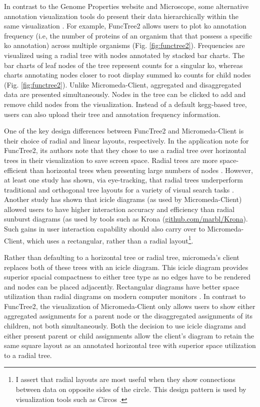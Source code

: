 In contrast to the Genome Properties website and Microscope, some alternative 
annotation visualization tools do present their data hierarchically within the 
same visualization \cite{darzi2019functree2}. For example, FuncTree2 
\cite{darzi2019functree2} allows users to plot \gls{ko} annotation 
\cite{mao2005automated,kanehisa2011kegg} frequency (i.e, the number of proteins 
of an organism that that possess a specific \gls{ko} annotation) across 
multiple organisms (Fig. \ref{fig:functree2}). Frequencies are visualized using 
a radial tree with nodes annotated by stacked bar charts. The bar charts of leaf 
nodes of the tree represent counts for a singular \gls{ko}, whereas charts 
annotating nodes closer to root display summed \gls{ko} counts for child nodes 
(Fig. \ref{fig:functree2}). Unlike Micromeda-Client, aggregated and 
disaggregated data are presented simultaneously. Nodes in the tree can be clicked 
to add and remove child nodes from the visualization. Instead of a default 
\gls{kegg}-based tree, users can also upload their tree and annotation frequency 
information.

One of the key design differences between FuncTree2 and Micromeda-Client is 
their choice of radial and linear layouts, respectively. In the application note 
for FuncTree2, its authors note that they chose to use a radial tree over 
horizontal trees in their visualization to save screen space. Radial trees are 
more space-efficient than horizontal trees when presenting large numbers of 
nodes \cite{burch2011evaluation}. However, at least one study has shown, via 
eye-tracking, that radial trees underperform traditional and orthogonal tree 
layouts for a variety of visual search tasks \cite{burch2011evaluation}. Another 
study has shown that icicle diagrams (as used by Micromeda-Client) allowed users 
to have higher interaction accuracy and efficiency \cite{muramalla2017radial} 
than radial sunburst diagrams (as used by tools such as Krona 
\cite{ondov2011interactive} 
(\href{http://github.com/marbl/Krona}{github.com/marbl/Krona}).
Such gains in user interaction capability should also carry over to 
Micromeda-Client, which uses a rectangular, rather than a radial 
layout\footnote{I assert that radial layouts are most useful when they show 
connections between data on opposite sides of the circle. This design pattern is 
used by visualization tools such as Circos \cite{krzywinski2009circos}.}.

Rather than defaulting to a horizontal tree or radial tree, micromeda's client 
replaces both of these trees with an icicle diagram. This icicle diagram 
provides superior spacial compactness to either tree type as no edges have to be 
rendered and nodes can be placed adjacently. Rectangular diagrams have better 
space utilization than radial diagrams on modern computer monitors 
\cite{muramalla2017radial}. In contrast to FuncTree2, the visualization of 
Micromeda-Client only allows users to show either aggregated assignments for a 
parent node or the disaggregated assignments of its children, not both 
simultaneously. Both the decision to use icicle diagrams and either present 
parent or child assignments allow the client's diagram to retain the same square 
layout as an annotated horizontal tree with superior space utilization to a 
radial tree. 

